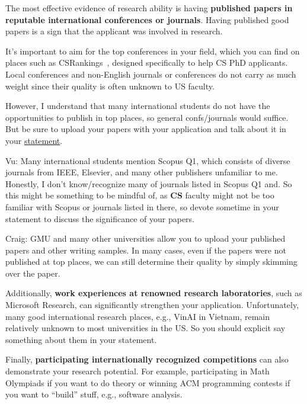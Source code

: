 \documentclass[11pt]{article}
\newenvironment{commentbox}{
 \small
    \begin{cbox}
 }{
   \end{cbox}
}
\begin{document}
The most effective evidence of research ability is having \textbf{published papers in reputable international conferences or journals}.
Having published good papers is a sign that the applicant was involved in research.

It's important to aim for the top conferences in your field, which you can
find on places such as CSRankings~\cite{csrankings}, designed specifically to help CS PhD
applicants. Local conferences and non-English journals or conferences do
not carry as much weight since their quality is often unknown to US
faculty.

However, I understand that many international students do not have the opportunities to publish in top places, so general confs/journals would suffice.  But be sure to upload your papers with your application and talk about it in your \hyperref[sec:research-statement]{statement}.

\begin{commentbox}
Vu: Many international students mention Scopus Q1, which consists of diverse journals from IEEE, Elsevier, and many other publishers unfamiliar to me.  Honestly, I don't know/recognize many of journals listed in Scopus Q1 and. So this might be something to be mindful of, as \textbf{CS} faculty might not be too familiar with Scopus or journals listed in there, so devote sometime in your statement to discuss the significance of your papers.
\end{commentbox}

\begin{commentbox}
Craig: GMU and many other universities allow you to upload your published papers and other writing samples. In many cases, even if the papers were not published at top places, we can still determine their quality by simply skimming over the paper.  
\end{commentbox}

Additionally, \textbf{work experiences at renowned research laboratories}, such as Microsoft Research, can significantly strengthen your
application.  Unfortunately, many good international research places, e.g., VinAI in Vietnam, remain relatively unknown to most universities in the US. So you should explicit say something about them in your statement.

Finally, \textbf{participating internationally recognized competitions} can also demonstrate your research potential.
For example, participating in Math Olympiads if you want to do theory or  winning ACM programming contests if you want to ``build'' stuff, e.g., software analysis.
\end{document}
